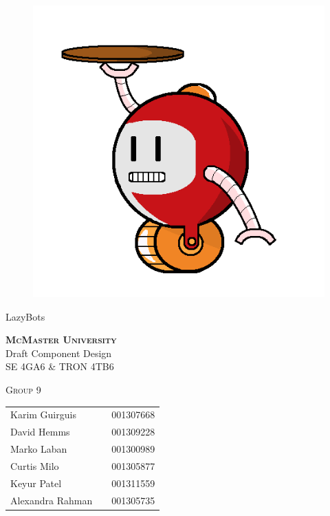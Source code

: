 \documentclass [10pt]{article}
\begin{document}
\begin {center} 

\thispagestyle{empty}
\vspace*{5cm}

\begin {figure}[h!]
\centering
\hspace{-10mm}\includegraphics [scale = .3, trim={.4cm 0 .8cm 0},clip] {figures/alfred.png}
\end {figure}

\Huge{LazyBots}

\vspace{1 cm}
{\Large\textbf{\textsc{McMaster University}}\\}  \vspace {1cm}
{\Large Draft Component Design\\ \vspace {0.4 cm} SE 4GA6 \& TRON 4TB6}  \vspace {1cm}

{\large \textsc{Group 9} \\} \vspace{1cm}



\begin{tabular}{ l c  l}
Karim Guirguis & & 001307668 \\
David Hemms & & 001309228 \\
Marko Laban & & 001300989 \\
Curtis Milo & & 001305877 \\
Keyur Patel & & 001311559 \\
Alexandra Rahman & & 001305735
\end{tabular}


\end{center}
\end{document}
